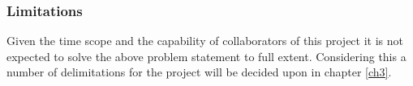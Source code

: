 \subsubsection{Limitations}
Given the time scope and the capability of collaborators of this project it is not expected to solve the above problem statement to full extent. Considering this a number of delimitations for the project will be decided upon in chapter \ref{ch3}.\\\\
%
